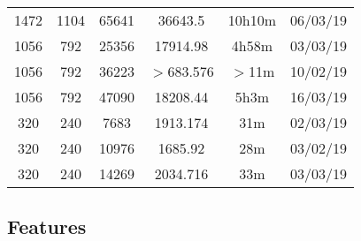 \begin{center}
\begin{tabular}{ c c c | c c c }
  1472 & 1104 & 65641 & 36643.5 & 10h10m & 06/03/19 \\
  1056 & 792 & 25356 & 17914.98 & 4h58m & 03/03/19 \\
  1056 & 792 & 36223 & $>$683.576 & $>$11m & 10/02/19 \\
  1056 & 792 & 47090 & 18208.44 & 5h3m & 16/03/19 \\
  320 & 240 & 7683 & 1913.174 & 31m & 02/03/19 \\
  320 & 240 & 10976 & 1685.92 & 28m & 03/02/19 \\
  320 & 240 & 14269 & 2034.716 & 33m & 03/03/19 \\
  \end{tabular}
  \end{center}

\newpage
\subsection{Features}
